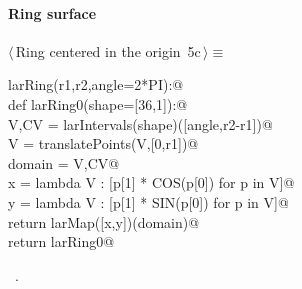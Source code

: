 \documentclass[11pt,oneside]{article}	%
\begin{document}
\paragraph{Ring surface}
\begin{flushleft} \small \label{scrap8}
\protect{}$\langle\,$Ring centered in the origin\nobreak\ {\footnotesize 5c}$\,\rangle\equiv$
\vspace{-1ex}
\begin{list}{}{} \item
\mbox{}\verb@def larRing(r1,r2,angle=2*PI):@\\
\mbox{}\verb@   def larRing0(shape=[36,1]):@\\
\mbox{}\verb@      V,CV = larIntervals(shape)([angle,r2-r1])@\\
\mbox{}\verb@      V = translatePoints(V,[0,r1])@\\
\mbox{}\verb@      domain = V,CV@\\
\mbox{}\verb@      x = lambda V : [p[1] * COS(p[0]) for p in V]@\\
\mbox{}\verb@      y = lambda V : [p[1] * SIN(p[0]) for p in V]@\\
\mbox{}\verb@      return larMap([x,y])(domain)@\\
\mbox{}\verb@   return larRing0@\\
\mbox{}\verb@@{\NWsep}
\end{list}
\vspace{-1ex}
\footnotesize\addtolength{\baselineskip}{-1ex}
\begin{list}{}{\setlength{\itemsep}{-\parsep}\setlength{\itemindent}{-\leftmargin}}
\item \NWtxtMacroRefIn\ .
\end{list}
\end{flushleft}
\end{document}
